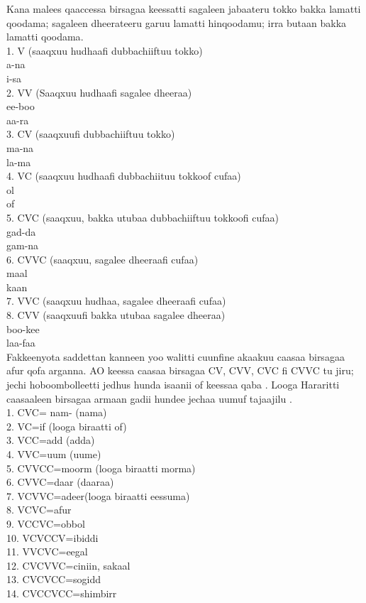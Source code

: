 \documentclass[11pt,b5paper]{book}
\begin{document}
\begin{itemize}
Kana malees qaaccessa birsagaa keessatti sagaleen jabaateru  tokko bakka lamatti qoodama; sagaleen dheerateeru garuu  lamatti hinqoodamu; irra butaan bakka lamatti qoodama\cite{griefenow2001grammatical}. \\
1. V (saaqxuu hudhaafi dubbachiiftuu tokko)  \\
 a-na  \\
 i-sa  \\
2. VV (Saaqxuu hudhaafi sagalee dheeraa)  \\
 ee-boo  \\
 aa-ra  \\
3. CV (saaqxuufi dubbachiiftuu tokko)  \\
 ma-na  \\
 la-ma  \\
4. VC (saaqxuu hudhaafi dubbachiituu tokkoof cufaa)  \\
 ol  \\
 of \\
5. CVC (saaqxuu, bakka utubaa dubbachiiftuu tokkoofi cufaa)  \\
 gad-da  \\
 gam-na  \\
6. CVVC (saaqxuu, sagalee dheeraafi cufaa)  \\
 maal  \\
 kaan  \\
7. VVC (saaqxuu hudhaa, sagalee dheeraafi cufaa)  \\
8. CVV (saaqxuufi bakka utubaa sagalee dheeraa)  \\
 boo-kee  \\
 laa-faa \\

Fakkeenyota saddettan kanneen yoo walitti cuunfine akaakuu  caasaa birsagaa afur qofa arganna. AO keessa caasaa birsagaa CV, CVV,  CVC fi CVVC tu jiru; jechi hoboombolleetti jedhus hunda  isaanii of keessaa qaba \cite[pp.21-22]{griefenow2001grammatical}. Looga Hararitti caasaaleen birsagaa armaan gadii hundee  jechaa uumuf tajaajilu \cite{owens1985grammar}.  \\
 1. CVC= nam- (nama) \\
 2. VC=if (looga biraatti of) \\
 3. VCC=add (adda) \\
 4. VVC=uum (uume) \\
 5. CVVCC=moorm (looga biraatti morma) \\
 6. CVVC=daar (daaraa) \\
 7. VCVVC=adeer(looga biraatti eessuma) \\
 8. VCVC=afur \\
 9. VCCVC=obbol \\
 10. VCVCCV=ibiddi\\
 11. VVCVC=eegal \\
 12. CVCVVC=ciniin, sakaal\\
 13. CVCVCC=sogidd \\
 14. CVCCVCC=shimbirr \\


\end{itemize}
\end{document}
